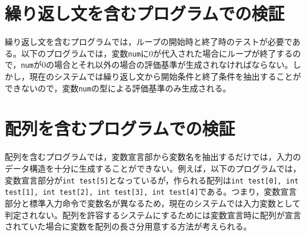 \documentclass{tpu-sotu}
\begin{document}
\section{繰り返し文を含むプログラムでの検証}
繰り返し文を含むプログラムでは，ループの開始時と終了時のテストが必要である。以下のプログラムでは，変数{\tt num}に0が代入された場合にループが終了するので，{\tt num}が0の場合とそれ以外の場合の評価基準が生成されなければならない。しかし，現在のシステムでは繰り返し文から開始条件と終了条件を抽出することができないので，変数{\tt num}の型による評価基準のみ生成される。

\section{配列を含むプログラムでの検証}
配列を含むプログラムでは，変数宣言部から変数名を抽出するだけでは，入力のデータ構造を十分に生成することができない。例えば，以下のプログラムでは，変数宣言部分が{\tt int test[5]}となっているが，作られる配列は{\tt int test[0], int test[1], int test[2], int test[3], int test[4]}である。つまり，変数宣言部分と標準入力命令で変数名が異なるため，現在のシステムでは入力変数として判定されない。配列を許容するシステムにするためには変数宣言時に配列が宣言されていた場合に変数を配列の長さ分用意する方法が考えられる。

\end{document}
